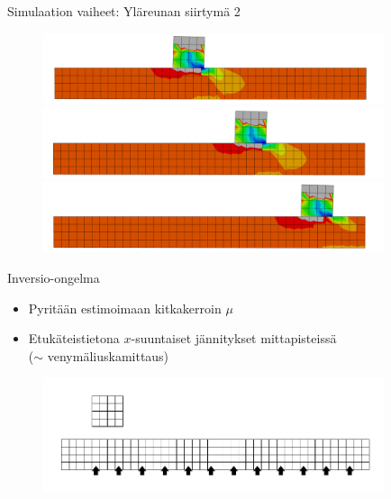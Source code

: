 \documentclass{beamer}
\begin{document}
\begin{frame}{Simulaation vaiheet: Yläreunan siirtymä 2}

\begin{figure}
\includegraphics[width=10cm]{anim3.pdf}\\
\includegraphics[width=10cm]{anim4.pdf}\\
\includegraphics[width=10cm]{anim5.pdf}
\end{figure}

\end{frame}

\begin{frame}{Inversio-ongelma}

\begin{itemize}
\item Pyritään estimoimaan kitkakerroin $\mu$
\item Etukäteistietona $x$-suuntaiset jännitykset mittapisteissä\\($\sim$ venymäliuskamittaus)
\end{itemize}

\begin{figure}
\includegraphics[width=10cm]{fretting_geom_meas.pdf}
\end{figure}


\end{frame}
\end{document}
